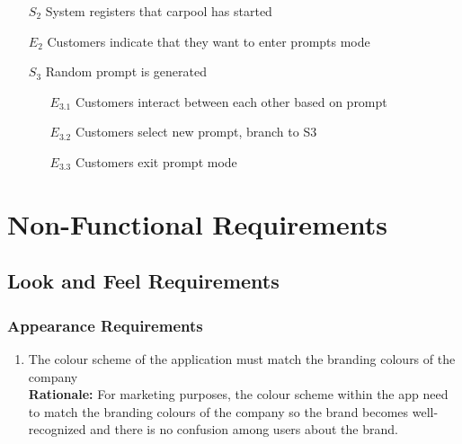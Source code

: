 \documentclass[]{article}
\begin{document}
\begin{enumerate}[{\textbf{BE}}1.]
\begin{enumerate}[{\textbf{VP7}}.1]
\begin{enumerate}
                \item[$S_2$] System registers that carpool has started
                \item[$E_2$] Customers indicate that they want to enter prompts mode
                \item[$S_3$] Random prompt is generated
                \begin{enumerate}
                    \item[$E_{3.1}$] Customers interact between each other based on prompt
                    \item[$E_{3.2}$] Customers select new prompt, branch to S3
                    \item[$E_{3.3}$] Customers exit prompt mode
                \end{enumerate}
            \end{enumerate}
    \end{enumerate}
\end{enumerate}

\section{Non-Functional Requirements}
\label{sec:non-functional_requirements}

\subsection{Look and Feel Requirements}
\label{sub:look_and_feel_requirements}

\subsubsection{Appearance Requirements}
\label{ssub:appearance_requirements}
\begin{enumerate}[{LF-A}1. ]
	\item The colour scheme of the application must match the branding colours of the company \\
	{\bf Rationale:} For marketing purposes, the colour scheme within the app need to match the branding colours of the company so the brand becomes well-recognized and there is no confusion among users about the brand.
\end{enumerate}
\end{document}
